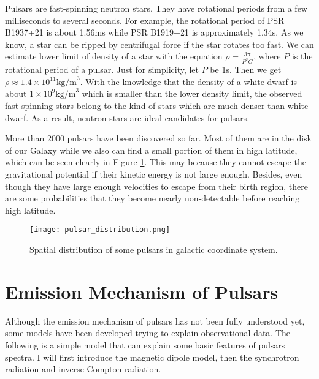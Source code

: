 \documentclass[12pt]{report}
\begin{document}
    Pulsars are fast-spinning neutron stars. They have rotational periods from a few 
    milliseconds to several seconds. For example, the rotational period of PSR B1937+21 is 
    about 1.56ms while PSR B1919+21 is approximately 1.34s. As we know, a star can be ripped 
    by centrifugal force if the star rotates too fast. We can estimate lower limit of 
    density of a star with the equation $\rho=\frac{3\pi}{P^2G}$, where $P$ is the 
    rotational period of a pulsar. Just for simplicity, let $P$ be 1s. Then we 
    get $\rho\approx 1.4\times 10^{11}\mbox{kg/m}^3$. With the knowledge that the 
    density of a white dwarf is about $1\times 10^9\mbox{kg/m}^3$ which is smaller than 
    the lower density limit, the observed fast-spinning stars belong to the kind of stars 
    which are much denser than white dwarf. As a result, neutron stars are ideal candidates 
    for pulsars. 
    
    More than 2000 pulsars have been discovered so far. Most of them are in the disk of 
    our Galaxy while we also can find a small portion of them in high latitude, which can be 
    seen clearly in Figure \ref{fig: spatial_distribution}. This may 
    because they cannot escape the gravitational potential if their kinetic energy is not 
    large enough. Besides, even though they have large enough velocities to escape from their 
    birth region, there are some probabilities that they become nearly non-detectable before 
    reaching high latitude. 

    \begin{figure}[!htp]
      \centering
      \texttt{[image: pulsar\_distribution.png]}
      \caption{Spatial distribution of some pulsars in galactic coordinate system.}
      \label{fig: spatial_distribution}
    \end{figure}

    
  \section{Emission Mechanism of Pulsars}
    Although the emission mechanism of pulsars has not been fully understood yet, some 
    models have been developed 
    trying to explain observational data. The following is a simple model that can explain 
    some basic features of pulsars spectra. I will first introduce the magnetic dipole model, 
    then the synchrotron radiation and inverse Compton radiation. 
\end{document}

